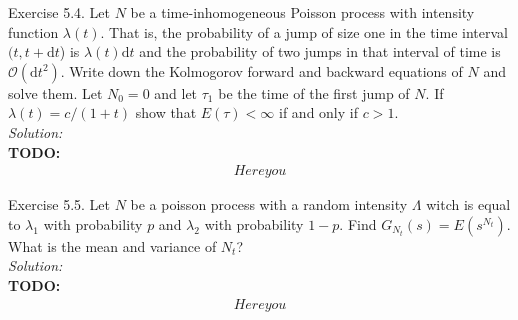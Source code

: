 \documentclass[10pt]{amsart}
\newcommand{\D}{\mathrm{d}}
\begin{document}
\newpage

 Exercise 5.4.
Let $N$ be a time-inhomogeneous Poisson process with intensity function $\lambda(t)$.
That is, the probability of a jump of size one in the time interval $(t, t + \D t$) is $\lambda(t) \D t$ and the probability of two jumps in that interval of time is $\mathcal O(\D t^2)$.
Write down the Kolmogorov forward and backward equations of $N$ and solve them.
Let $N_0 = 0$ and let $\tau_1$ be the time of the first jump of $N$.
If $\lambda(t) = c/(1 + t)$ show that $E(\tau) < \infty$ if and only if $c > 1$. \\

\noindent
\textit{Solution:} \\
\textbf{TODO:} \\
\begin{align*}
Here you
\end{align*}

\newpage

 Exercise 5.5.
Let $N$ be a poisson process with a random intensity $\Lambda$ witch is equal to $\lambda_1$ with probability $p$ and $\lambda_2$ with probability $1 - p$.
Find $G_{N_t}(s) = E(s^{N_t})$.
What is the mean and variance of $N_t$? \\

\noindent
\textit{Solution:} \\
\textbf{TODO:} \\
\begin{align*}
Here you
\end{align*}
\end{document}

